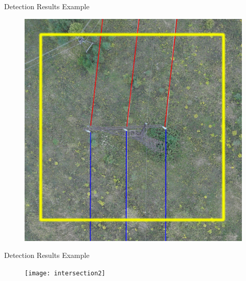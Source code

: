 \documentclass{beamer}
\begin{document}
\begin{frame}[t, fragile]{Detection Results Example}
\begin{figure}
\centering
\includegraphics[scale=0.045]{intersection1}
\end{figure}
\end{frame}

\begin{frame}[t, fragile]{Detection Results Example}
\begin{figure}
\centering
\texttt{[image: intersection2]}
\end{figure}
\end{frame}
\end{document}
